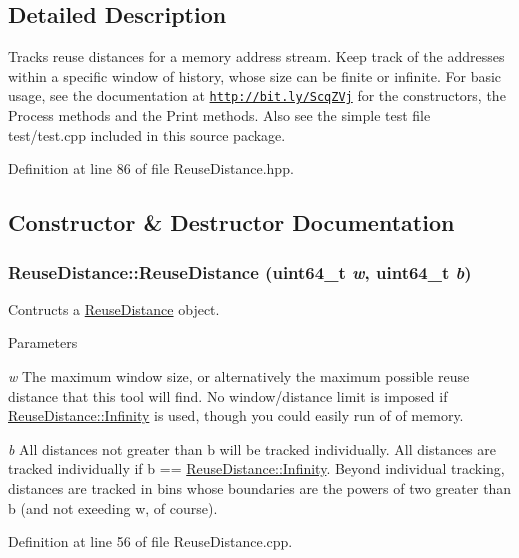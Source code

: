 \subsection{Detailed Description}
Tracks reuse distances for a memory address stream. Keep track of the addresses within a specific window of history, whose size can be finite or infinite. For basic usage, see the documentation at \href{http://bit.ly/ScqZVj}{\tt http://bit.ly/ScqZVj} for the constructors, the Process methods and the Print methods. Also see the simple test file test/test.cpp included in this source package. 

Definition at line 86 of file ReuseDistance.hpp.



\subsection{Constructor \& Destructor Documentation}
\hypertarget{class_reuse_distance_a0248afa697da0f6c87c6fd30c289ecc6}{
\subsubsection[{ReuseDistance}]{\setlength{\rightskip}{0pt plus 5cm}ReuseDistance::ReuseDistance (uint64\_\-t {\em w}, \/  uint64\_\-t {\em b})}}
\label{class_reuse_distance_a0248afa697da0f6c87c6fd30c289ecc6}
Contructs a \hyperlink{class_reuse_distance}{ReuseDistance} object.


\begin{DoxyParams}{Parameters}
\item[{\em w}]The maximum window size, or alternatively the maximum possible reuse distance that this tool will find. No window/distance limit is imposed if \hyperlink{class_reuse_distance_a59f7f0ac6ad014472537619394ac7375}{ReuseDistance::Infinity} is used, though you could easily run of of memory. \item[{\em b}]All distances not greater than b will be tracked individually. All distances are tracked individually if b == \hyperlink{class_reuse_distance_a59f7f0ac6ad014472537619394ac7375}{ReuseDistance::Infinity}. Beyond individual tracking, distances are tracked in bins whose boundaries are the powers of two greater than b (and not exeeding w, of course). \end{DoxyParams}


Definition at line 56 of file ReuseDistance.cpp.

